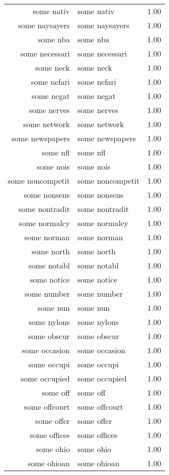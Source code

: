 \begin{table}[ht]
\begin{tabular}{rlr}
  some nativ & some nativ & 1.00 \\ 
  some naysayers & some naysayers & 1.00 \\ 
  some nba & some nba & 1.00 \\ 
  some necessari & some necessari & 1.00 \\ 
  some neck & some neck & 1.00 \\ 
  some nefari & some nefari & 1.00 \\ 
  some negat & some negat & 1.00 \\ 
  some nerves & some nerves & 1.00 \\ 
  some network & some network & 1.00 \\ 
  some newspapers & some newspapers & 1.00 \\ 
  some nfl & some nfl & 1.00 \\ 
  some nois & some nois & 1.00 \\ 
  some noncompetit & some noncompetit & 1.00 \\ 
  some nonsens & some nonsens & 1.00 \\ 
  some nontradit & some nontradit & 1.00 \\ 
  some normalcy & some normalcy & 1.00 \\ 
  some norman & some norman & 1.00 \\ 
  some north & some north & 1.00 \\ 
  some notabl & some notabl & 1.00 \\ 
  some notice & some notice & 1.00 \\ 
  some number & some number & 1.00 \\ 
  some nun & some nun & 1.00 \\ 
  some nylons & some nylons & 1.00 \\ 
  some obscur & some obscur & 1.00 \\ 
  some occasion & some occasion & 1.00 \\ 
  some occupi & some occupi & 1.00 \\ 
  some occupied & some occupied & 1.00 \\ 
  some off & some off & 1.00 \\ 
  some offcourt & some offcourt & 1.00 \\ 
  some offer & some offer & 1.00 \\ 
  some offices & some offices & 1.00 \\ 
  some ohio & some ohio & 1.00 \\ 
  some ohioan & some ohioan & 1.00 \\ 

\end{tabular}
\end{table}
